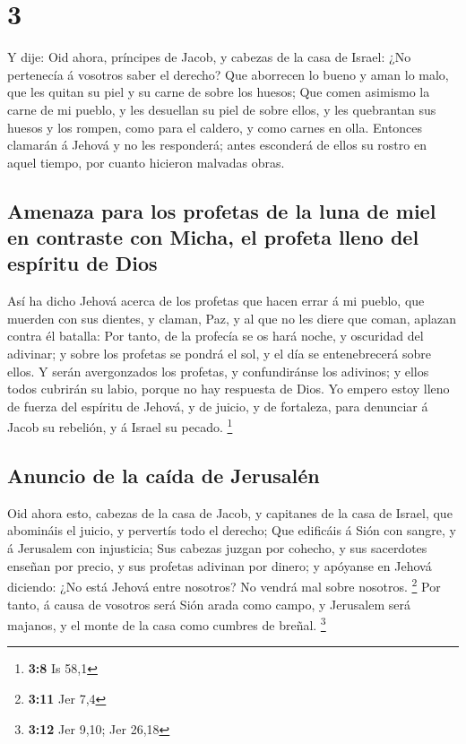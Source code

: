 \hypertarget{section-2}{%
\section{3}\label{section-2}}

 Y dije: Oid ahora, príncipes de Jacob, y cabezas de la
casa de Israel: ¿No pertenecía á vosotros saber el derecho?
 Que aborrecen lo bueno y aman lo malo, que les quitan su
piel y su carne de sobre los huesos;  Que comen asimismo
la carne de mi pueblo, y les desuellan su piel de sobre ellos, y les
quebrantan sus huesos y los rompen, como para el caldero, y como carnes
en olla.  Entonces clamarán á Jehová y no les responderá;
antes esconderá de ellos su rostro en aquel tiempo, por cuanto hicieron
malvadas obras.

\hypertarget{amenaza-para-los-profetas-de-la-luna-de-miel-en-contraste-con-micha-el-profeta-lleno-del-espuxedritu-de-dios}{%
\subsection{Amenaza para los profetas de la luna de miel en contraste
con Micha, el profeta lleno del espíritu de
Dios}\label{amenaza-para-los-profetas-de-la-luna-de-miel-en-contraste-con-micha-el-profeta-lleno-del-espuxedritu-de-dios}}

 Así ha dicho Jehová acerca de los profetas que hacen
errar á mi pueblo, que muerden con sus dientes, y claman, Paz, y al que
no les diere que coman, aplazan contra él batalla:  Por
tanto, de la profecía se os hará noche, y oscuridad del adivinar; y
sobre los profetas se pondrá el sol, y el día se entenebrecerá sobre
ellos.  Y serán avergonzados los profetas, y confundiránse
los adivinos; y ellos todos cubrirán su labio, porque no hay respuesta
de Dios.  Yo empero estoy lleno de fuerza del espíritu de
Jehová, y de juicio, y de fortaleza, para denunciar á Jacob su rebelión,
y á Israel su pecado. \footnote{\textbf{3:8} Is 58,1}

\hypertarget{anuncio-de-la-cauxedda-de-jerusaluxe9n}{%
\subsection{Anuncio de la caída de
Jerusalén}\label{anuncio-de-la-cauxedda-de-jerusaluxe9n}}

 Oid ahora esto, cabezas de la casa de Jacob, y capitanes
de la casa de Israel, que abomináis el juicio, y pervertís todo el
derecho;  Que edificáis á Sión con sangre, y á Jerusalem
con injusticia;  Sus cabezas juzgan por cohecho, y sus
sacerdotes enseñan por precio, y sus profetas adivinan por dinero; y
apóyanse en Jehová diciendo: ¿No está Jehová entre nosotros? No vendrá
mal sobre nosotros. \footnote{\textbf{3:11} Jer 7,4}  Por
tanto, á causa de vosotros será Sión arada como campo, y Jerusalem será
majanos, y el monte de la casa como cumbres de breñal. \footnote{\textbf{3:12}
  Jer 9,10; Jer 26,18}

